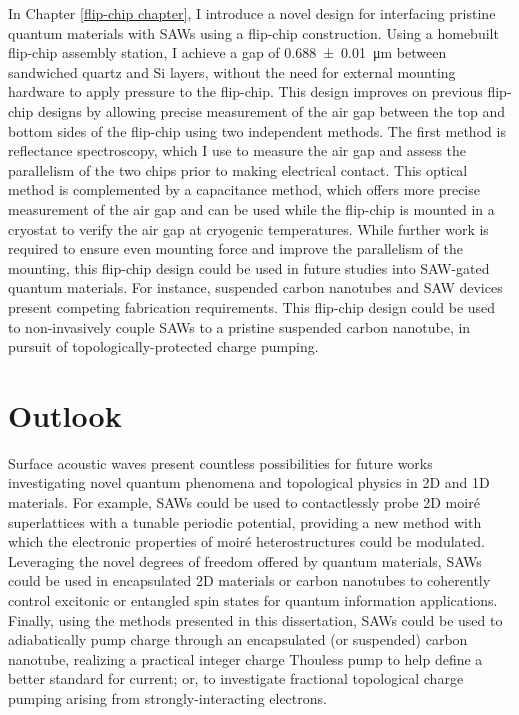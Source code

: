 \documentclass[double,12pt,1in,seploa]{beavtex}
\let\Oldsection\section
\renewcommand{\section}{\FloatBarrier\Oldsection}
\begin{document}
In Chapter \ref{flip-chip chapter}, I introduce a novel design for interfacing pristine quantum materials with SAWs using a flip-chip construction. Using a homebuilt flip-chip assembly station, I achieve a gap of \SI{0.688(10)}{\micro\meter} between sandwiched quartz and Si layers, without the need for external mounting hardware to apply pressure to the flip-chip. This design improves on previous flip-chip designs by allowing precise measurement of the air gap between the top and bottom sides of the flip-chip using two independent methods. The first method is reflectance spectroscopy, which I use to measure the air gap and assess the parallelism of the two chips prior to making electrical contact. This optical method is complemented by a capacitance method, which offers more precise measurement of the air gap and can be used while the flip-chip is mounted in a cryostat to verify the air gap at cryogenic temperatures. While further work is required to ensure even mounting force and improve the parallelism of the mounting, this flip-chip design could be used in future studies into SAW-gated quantum materials. For instance, suspended carbon nanotubes and SAW devices present competing fabrication requirements. This flip-chip design could be used to non-invasively couple SAWs to a pristine suspended carbon nanotube, in pursuit of topologically-protected charge pumping.

\section{Outlook}
Surface acoustic waves present countless possibilities for future works investigating novel quantum phenomena and topological physics in 2D and 1D materials. For example, SAWs could be used to contactlessly probe 2D moiré superlattices with a tunable periodic potential, providing a new method with which the electronic properties of moiré heterostructures could be modulated. Leveraging the novel degrees of freedom offered by quantum materials, SAWs could be used in encapsulated 2D materials or carbon nanotubes to coherently control excitonic or entangled spin states for quantum information applications. Finally, using the methods presented in this dissertation, SAWs could be used to adiabatically pump charge through an encapsulated (or suspended) carbon nanotube, realizing a practical integer charge Thouless pump to help define a better standard for current; or, to investigate fractional topological charge pumping arising from strongly-interacting electrons. 
\end{document}
